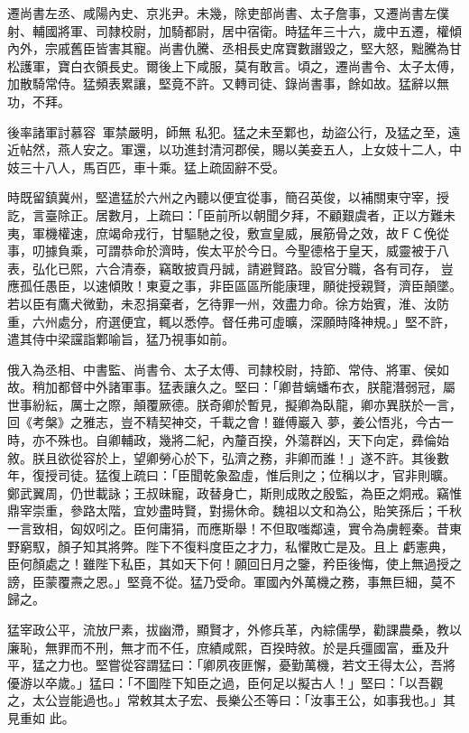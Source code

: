 \begin{pinyinscope}
 遷尚書左丞、咸陽內史、京兆尹。未幾，除吏部尚書、太子詹事，又遷尚書左僕射、輔國將軍、司隸校尉，加騎都尉，居中宿衛。時猛年三十六，歲中五遷，權傾內外，宗戚舊臣皆害其寵。尚書仇騰、丞相長史席寶數譖毀之，堅大怒，黜騰為甘松護軍，寶白衣領長史。爾後上下咸服，莫有敢言。頃之，遷尚書令、太子太傅，加散騎常侍。猛頻表累讓，堅竟不許。又轉司徒、錄尚書事，餘如故。猛辭以無功，不拜。



 後率諸軍討慕容，軍禁嚴明，師無
 私犯。猛之未至鄴也，劫盜公行，及猛之至，遠近帖然，燕人安之。軍還，以功進封清河郡侯，賜以美妾五人，上女妓十二人，中妓三十八人，馬百匹，車十乘。猛上疏固辭不受。



 時既留鎮冀州，堅遣猛於六州之內聽以便宜從事，簡召英俊，以補關東守宰，授訖，言臺除正。居數月，上疏曰：「臣前所以朝聞夕拜，不顧艱虞者，正以方難未夷，軍機權速，庶竭命戎行，甘驅馳之役，敷宣皇威，展筋骨之效，故ＦＣ俛從事，叨據負乘，可謂恭命於濟時，俟太平於今日。今聖德格于皇天，威靈被于八表，弘化已熙，六合清泰，竊敢披貢丹誠，請避賢路。設官分職，各有司存，
 豈應孤任愚臣，以速傾敗！東夏之事，非臣區區所能康理，願徙授親賢，濟臣顛墜。若以臣有鷹犬微勤，未忍捐棄者，乞待罪一州，效盡力命。徐方始賓，淮、汝防重，六州處分，府選便宜，輒以悉停。督任弗可虛曠，深願時降神規。」堅不許，遣其侍中梁讜詣鄴喻旨，猛乃視事如前。



 俄入為丞相、中書監、尚書令、太子太傅、司隸校尉，持節、常侍、將軍、侯如故。稍加都督中外諸軍事。猛表讓久之。堅曰：「卿昔螭蟠布衣，朕龍潛弱冠，屬世事紛紜，厲士之際，顛覆厥德。朕奇卿於暫見，擬卿為臥龍，卿亦異朕於一言，回《考槃》之雅志，豈不精契神交，千載之會！雖傅巖入
 夢，姜公悟兆，今古一時，亦不殊也。自卿輔政，幾將二紀，內釐百揆，外蕩群凶，天下向定，彞倫始敘。朕且欲從容於上，望卿勞心於下，弘濟之務，非卿而誰！」遂不許。其後數年，復授司徒。猛復上疏曰：「臣聞乾象盈虛，惟后則之；位稱以才，官非則曠。鄭武翼周，仍世載詠；王叔昧寵，政替身亡，斯則成敗之殷監，為臣之炯戒。竊惟鼎宰崇重，參路太階，宜妙盡時賢，對揚休命。魏祖以文和為公，貽笑孫后；千秋一言致相，匈奴吲之。臣何庸狷，而應斯舉！不但取嗤鄰遠，實令為虜輕秦。昔東野窮馭，顏子知其將弊。陛下不復料度臣之才力，私懼敗亡是及。且上
 虧憲典，臣何顏處之！雖陛下私臣，其如天下何！願回日月之鑒，矜臣後悔，使上無過授之謗，臣蒙覆燾之恩。」堅竟不從。猛乃受命。軍國內外萬機之務，事無巨細，莫不歸之。



 猛宰政公平，流放尸素，拔幽滯，顯賢才，外修兵革，內綜儒學，勸課農桑，教以廉恥，無罪而不刑，無才而不任，庶績咸熙，百揆時敘。於是兵彊國富，垂及升平，猛之力也。堅嘗從容謂猛曰：「卿夙夜匪懈，憂勤萬機，若文王得太公，吾將優游以卒歲。」猛曰：「不圖陛下知臣之過，臣何足以擬古人！」堅曰：「以吾觀之，太公豈能過也。」常敕其太子宏、長樂公丕等曰：「汝事王公，如事我也。」其見重如
 此。




\end{pinyinscope}

